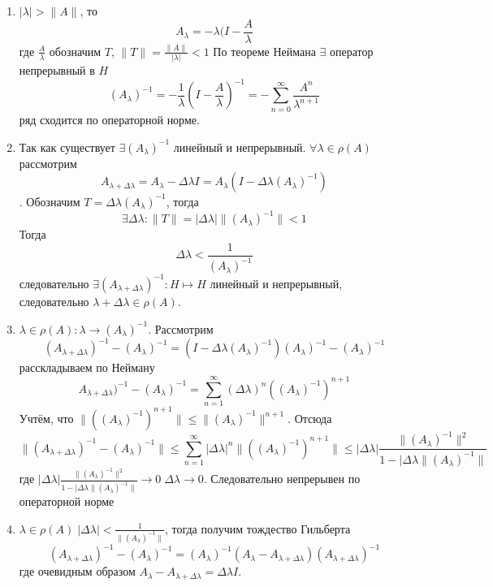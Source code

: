 \documentclass[12pt]{article}
\newcommand{\Al}{A_\lambda}
\newcommand{\Alo}{(\Al)^{-1}}
\begin{document}
\begin{Proof}
    \begin{enumerate}
        \item{$|\lambda| > \|A\|$, то
        $$
        \Al = -\lambda(I - \frac{A}{\lambda}
        $$
        где $\frac{A}{\lambda}$  обозначим $T$, $\|T\| = \frac{\|A\|}{|\lambda|}<1$
        По теореме Неймана $\exists$ оператор непрерывный в $H$
        $$
        \Alo = -\frac{1}{\lambda}(I - \frac{A}{\lambda})^{-1} =
            -\sum_{n=0}^\infty \frac{A^n}{\lambda^{n+1}}
        $$
        ряд сходится по операторной норме.}
        \item{Так как существует $\exists \Alo$ линейный и непрерывный.
        $\forall \lambda \in \rho(A)$ рассмотрим 
        $$
        A_{\lambda + \Delta\lambda} = \Al - \Delta\lambda I = \Al(I - 
            \Delta\lambda\Alo)
            $$.
            Обозначим $T = \Delta\lambda\Alo$, тогда
            $$
            \exists \Delta\lambda\colon \|T\|=|\Delta\lambda|\|\Alo\| < 1
            $$
            Тогда 
            $$
            \Delta\lambda < \frac{1}{\Alo}
            $$
             следовательно $\exists (A_{\lambda+\Delta\lambda})^{-1} : H \mapsto H$ линейный и непрерывный, следовательно
            $\lambda + \Delta\lambda \in \rho(A)$.}
        \item{$\lambda \in \rho(A)\colon \lambda \to \Alo$.
        Рассмотрим
            $$
            (A_{\lambda + \Delta\lambda})^{-1} - \Alo = (I - \Delta\lambda\Alo)\Alo - \Alo
            $$
            расскладываем по Нейману 
            $$
            A_{\lambda + \Delta\lambda})^{-1} - \Alo = \sum_{n=1}^\infty
            (\Delta\lambda)^n(\Alo)^{n+1}
            $$
            Учтём, что $\|(\Alo)^{n+1}\| \le \|\Alo\|^{n+1}$.
            Отсюда 
            $$
            \|(A_{\lambda + \Delta\lambda})^{-1} - \Alo\| \le \sum_{n=1}^\infty |\Delta\lambda|^n\|(\Alo)^{n+1}\| \le
            |\Delta\lambda| \frac{\|\Alo\|^2}{1-|\Delta\lambda\|\Alo\|}
            $$
            где $|\Delta\lambda| \frac{\|\Alo\|^2}{1-|\Delta\lambda\|\Alo\|} \to 0\; \Delta\lambda \to 0$.
            Следовательно непрерывен по операторной норме}
        \item{$\lambda \in \rho(A)\;|\Delta\lambda| < \frac{1}{\|\Alo\|}$, тогда
        получим тождество Гильберта 
        $$
        (A_{\lambda + \Delta\lambda})^{-1} - \Alo =
            \Alo(\Al - A_{\lambda + \Delta\lambda})(A_{\lambda + \Delta\lambda})^{-1} 
            $$
            где очевидным образом $\Al - A_{\lambda + \Delta\lambda} = \Delta\lambda I$.
}
\end{enumerate}
\end{Proof}
\end{document}
